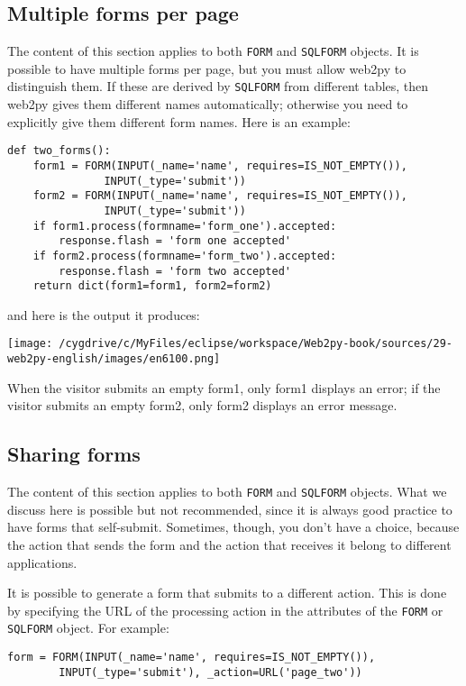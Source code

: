 \documentclass[justified,sixbynine,notoc]{tufte-book}
\def\ft{\small\tt}
\begin{document}
\begin{fullwidth}
\goodbreak\subsection{Multiple forms per page}

The content of this section applies to both {\ft FORM} and {\ft SQLFORM} objects.
It is possible to have multiple forms per page, but you must allow web2py to distinguish them. If these are derived by {\ft SQLFORM} from different tables, then web2py gives them different names automatically; otherwise you need to explicitly give them different form names. Here is an example:
\begin{lstlisting}
def two_forms():
    form1 = FORM(INPUT(_name='name', requires=IS_NOT_EMPTY()),
               INPUT(_type='submit'))
    form2 = FORM(INPUT(_name='name', requires=IS_NOT_EMPTY()),
               INPUT(_type='submit'))
    if form1.process(formname='form_one').accepted:
        response.flash = 'form one accepted'
    if form2.process(formname='form_two').accepted:
        response.flash = 'form two accepted'
    return dict(form1=form1, form2=form2)
\end{lstlisting}
\noindent and here is the output it produces:


\goodbreak\begin{center}\texttt{[image: /cygdrive/c/MyFiles/eclipse/workspace/Web2py-book/sources/29-web2py-english/images/en6100.png]}\end{center}


When the visitor submits an empty form1, only form1 displays an error; if the visitor submits an empty form2, only form2 displays an error message.

\goodbreak\subsection{Sharing forms}

The content of this section applies to both {\ft FORM} and {\ft SQLFORM} objects. What we discuss here is possible but not recommended, since it is always good practice to have forms that self-submit. Sometimes, though, you don't have a choice, because the action that sends the form and the action that receives it belong to different applications.

It is possible to generate a form that submits to a different action. This is done by specifying the URL of the processing action in the attributes of the {\ft FORM} or {\ft SQLFORM} object. For example:
\begin{lstlisting}
form = FORM(INPUT(_name='name', requires=IS_NOT_EMPTY()),
        INPUT(_type='submit'), _action=URL('page_two'))


\end{lstlisting}
\end{fullwidth}
\end{document}
